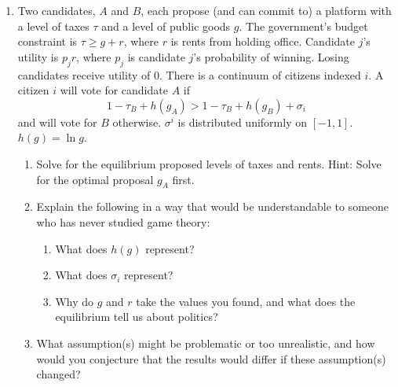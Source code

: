 \documentclass[fleqn,titlepage,12pt]{article}
\begin{document}
\begin{enumerate}
\item Two candidates, $A$ and $B$, each propose (and can commit to) a
platform with a level of taxes $\tau $ and a level of public goods $g$. The
government's budget constraint is $\tau \geq g+r$, where $r$ is rents from
holding office. Candidate $j$'s utility is $p_{j}r$, where $p_{j}$ is
candidate $j$'s probability of winning. Losing candidates receive utility of 
$0$. There is a continuum of citizens indexed $i$. A citizen $i$ will vote
for candidate $A$ if 
\begin{equation*}
1-\tau _{B}+h\left( g_{A}\right) >1-\tau _{B}+h\left( g_{B}\right) +\sigma
_{i}
\end{equation*}%
and will vote for $B$ otherwise. $\sigma ^{i}$\vspace{0in} is distributed
uniformly on $\left[ -1,1\right] $. $h\left( g\right) =\ln g$.

\begin{enumerate}
\item Solve for the equilibrium proposed levels of taxes and rents. Hint:
Solve for the optimal proposal $g_{A}$ first.

\item Explain the following in a way that would be understandable to someone
who has never studied game theory:

\begin{enumerate}
\item What does $h\left( g\right) $ represent?

\item What does $\sigma _{i}$ represent?

\item Why do $g$ and $r$ take the values you found, and what does the
equilibrium tell us about politics?
\end{enumerate}

\item What assumption(s) might be problematic or too unrealistic, and how
would you conjecture that the results would differ if these assumption(s)
changed?
\end{enumerate}


\end{enumerate}
\end{document}
